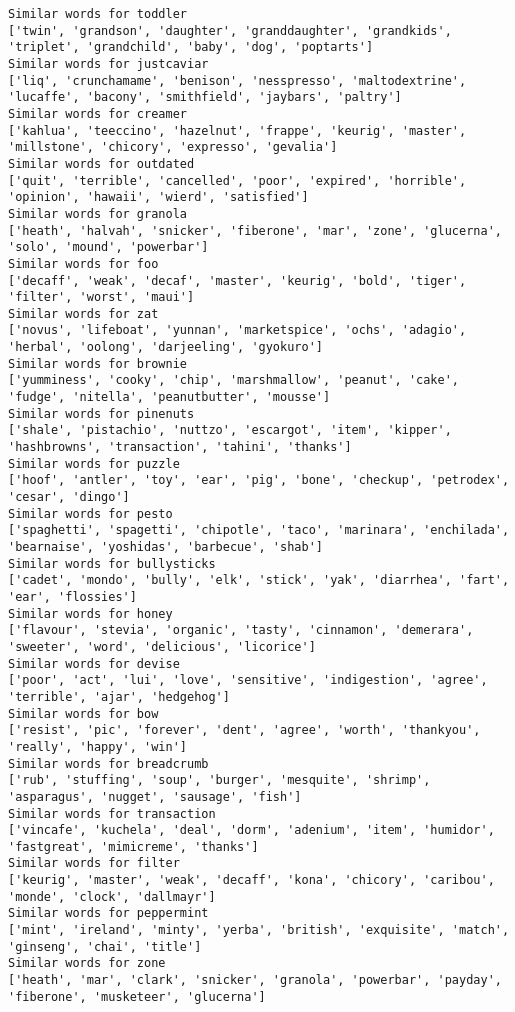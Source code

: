 \documentclass[11pt]{article}
\begin{document}
\begin{Verbatim}[commandchars=\\\{\}]
Similar words for toddler
['twin', 'grandson', 'daughter', 'granddaughter', 'grandkids', 'triplet', 'grandchild', 'baby', 'dog', 'poptarts']
Similar words for justcaviar
['liq', 'crunchamame', 'benison', 'nesspresso', 'maltodextrine', 'lucaffe', 'bacony', 'smithfield', 'jaybars', 'paltry']
Similar words for creamer
['kahlua', 'teeccino', 'hazelnut', 'frappe', 'keurig', 'master', 'millstone', 'chicory', 'expresso', 'gevalia']
Similar words for outdated
['quit', 'terrible', 'cancelled', 'poor', 'expired', 'horrible', 'opinion', 'hawaii', 'wierd', 'satisfied']
Similar words for granola
['heath', 'halvah', 'snicker', 'fiberone', 'mar', 'zone', 'glucerna', 'solo', 'mound', 'powerbar']
Similar words for foo
['decaff', 'weak', 'decaf', 'master', 'keurig', 'bold', 'tiger', 'filter', 'worst', 'maui']
Similar words for zat
['novus', 'lifeboat', 'yunnan', 'marketspice', 'ochs', 'adagio', 'herbal', 'oolong', 'darjeeling', 'gyokuro']
Similar words for brownie
['yumminess', 'cooky', 'chip', 'marshmallow', 'peanut', 'cake', 'fudge', 'nitella', 'peanutbutter', 'mousse']
Similar words for pinenuts
['shale', 'pistachio', 'nuttzo', 'escargot', 'item', 'kipper', 'hashbrowns', 'transaction', 'tahini', 'thanks']
Similar words for puzzle
['hoof', 'antler', 'toy', 'ear', 'pig', 'bone', 'checkup', 'petrodex', 'cesar', 'dingo']
Similar words for pesto
['spaghetti', 'spagetti', 'chipotle', 'taco', 'marinara', 'enchilada', 'bearnaise', 'yoshidas', 'barbecue', 'shab']
Similar words for bullysticks
['cadet', 'mondo', 'bully', 'elk', 'stick', 'yak', 'diarrhea', 'fart', 'ear', 'flossies']
Similar words for honey
['flavour', 'stevia', 'organic', 'tasty', 'cinnamon', 'demerara', 'sweeter', 'word', 'delicious', 'licorice']
Similar words for devise
['poor', 'act', 'lui', 'love', 'sensitive', 'indigestion', 'agree', 'terrible', 'ajar', 'hedgehog']
Similar words for bow
['resist', 'pic', 'forever', 'dent', 'agree', 'worth', 'thankyou', 'really', 'happy', 'win']
Similar words for breadcrumb
['rub', 'stuffing', 'soup', 'burger', 'mesquite', 'shrimp', 'asparagus', 'nugget', 'sausage', 'fish']
Similar words for transaction
['vincafe', 'kuchela', 'deal', 'dorm', 'adenium', 'item', 'humidor', 'fastgreat', 'mimicreme', 'thanks']
Similar words for filter
['keurig', 'master', 'weak', 'decaff', 'kona', 'chicory', 'caribou', 'monde', 'clock', 'dallmayr']
Similar words for peppermint
['mint', 'ireland', 'minty', 'yerba', 'british', 'exquisite', 'match', 'ginseng', 'chai', 'title']
Similar words for zone
['heath', 'mar', 'clark', 'snicker', 'granola', 'powerbar', 'payday', 'fiberone', 'musketeer', 'glucerna']

\end{Verbatim}
\end{document}
